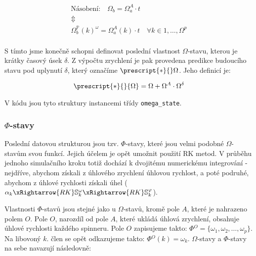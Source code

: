 \documentclass[12pt, a4paper,
 twoside,        %
 openright
]{report}
\begin{document}
\begin{equation}
    \label{eq:sim_equations_formalized4}
    \begin{gathered}
        \text{Násobení:}\quad
        \Omega_{b} = \Omega_{a}^A \cdot t \quad \quad \\
        \Updownarrow \\
        \Omega_{b}^{\mathbb{P}}(k)^{\omega} = \Omega_{a}^{A}(k) \cdot t
        \quad \forall k \in {1, \ldots, \Omega^{p}} \\
    \end{gathered}
\end{equation}

S tímto jsme konečně schopni definovat poslední vlastnost $\Omega$-stavu, kterou je krátky časový úsek $\delta$. 
Z výpočtu zrychlení je pak provedena predikce budoucího stavu pod uplynutí $\delta$, který označíme $\prescript{*}{}\Omega$.
Jeho definicí je:

\begin{equation}
    \label{eq:sim_equations_formalized5}
    \begin{gathered}
        \prescript{*}{}{\Omega} = \Omega + \Omega^A \cdot \Omega^{\delta}
    \end{gathered}
\end{equation}

V kódu jsou tyto struktury instancemi třídy \texttt{omega\_state}.

\clearpage

\subsubsection{$\Phi$-stavy}

Poslední datovou strukturou jsou tzv. $\Phi$-stavy, které jsou velmi podobné $\Omega$-stavům svou funkcí. Jejich účelem je opět umožnit použití RK metod. V průběhu jednoho simulačního kroku totiž dochází k dvojitému numerickému integrování - nejdříve, abychom získali z úhlového zrychlení úhlovou rychlost, a poté podruhé, abychom z úhlové rychlosti získali úhel
($\alpha_k \xRightarrow{RK} \mathbb{S}_k^{\omega}  \xRightarrow{RK} \mathbb{S}_k^{\varphi}$).

Vlastnosti $\Phi$-stavů jsou stejné jako u $\Omega$-stavů, kromě pole $A$, které je nahrazeno polem $O$. Pole $O$, narozdíl od pole $A$, které ukládá úhlová zrychlení, obsahuje úhlové rychlosti každého spinneru. Pole $O$ zapisujeme takto: $\Phi{}^{O} = \{ \omega_1, \omega_2, \ldots, \omega_p\}$. Na libovoný $k$. člen se opět odkazujeme takto: $\Phi{}^{O}(k) = \omega_k$. $\Omega$-stavy a $\Phi$-stavy na sebe navazují následovně:
\end{document}

